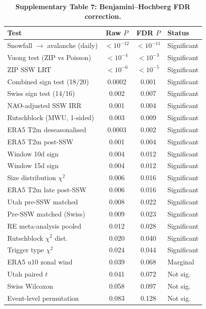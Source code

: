 \documentclass[11pt,a4paper]{article}
\begin{document}
\begin{table}[!ht]
\centering
\caption{\textbf{Supplementary Table 7: Benjamini--Hochberg FDR correction.}}
\label{stab:fdr}
\small
\begin{tabular}{lccl}
\toprule
Test & Raw $P$ & FDR $P$ & Status \\
\midrule
Snowfall $\to$ avalanche (daily) & $<10^{-12}$ & $<10^{-11}$ & Significant \\
Vuong test (ZIP vs Poisson) & $<10^{-4}$ & $<10^{-3}$ & Significant \\
ZIP SSW LRT & $<10^{-6}$ & $<10^{-5}$ & Significant \\
Combined sign test (18/20) & 0.0002 & 0.001 & Significant \\
Swiss sign test (14/16) & 0.002 & 0.007 & Significant \\
NAO-adjusted SSW IRR & 0.001 & 0.004 & Significant \\
Rutschblock (MWU, 1-sided) & 0.003 & 0.009 & Significant \\
ERA5 T2m deseasonalised & 0.0003 & 0.002 & Significant \\
ERA5 T2m post-SSW & 0.001 & 0.004 & Significant \\
Window 10d sign & 0.004 & 0.012 & Significant \\
Window 15d sign & 0.004 & 0.012 & Significant \\
Size distribution $\chi^2$ & 0.006 & 0.016 & Significant \\
ERA5 T2m late post-SSW & 0.006 & 0.016 & Significant \\
Utah pre-SSW matched & 0.008 & 0.022 & Significant \\
Pre-SSW matched (Swiss) & 0.009 & 0.023 & Significant \\
RE meta-analysis pooled & 0.012 & 0.028 & Significant \\
Rutschblock $\chi^2$ dist. & 0.020 & 0.040 & Significant \\
Trigger type $\chi^2$ & 0.024 & 0.044 & Significant \\
ERA5 u10 zonal wind & 0.039 & 0.068 & Marginal \\
Utah paired $t$ & 0.041 & 0.072 & Not sig. \\
Swiss Wilcoxon & 0.058 & 0.097 & Not sig. \\
Event-level permutation & 0.083 & 0.128 & Not sig. \\
\bottomrule
\end{tabular}
\end{table}
\end{document}
